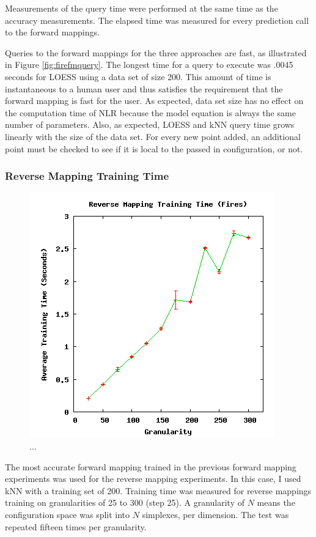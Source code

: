 Measurements of the query time were performed at the same time as the accuracy measurements.
The elapsed time was measured for every prediction call to the forward mappings.

Queries to the forward mappings for the three approaches are fast, as illustrated in Figure \ref{fig:firefmquery}.
The longest time for a query to execute was .0045 seconds for LOESS using a data set of size 200.
This amount of time is instantaneous to a human user and thus satisfies the requirement that the forward mapping is fast for the user.
As expected, data set size has no effect on the computation time of NLR because the model equation is always the same number of parameters.
Also, as expected, LOESS and kNN query time grows linearly with the size of the data set.
For every new point added, an additional point must be checked to see if it is local to the passed in configuration, or not.


\subsubsection{Reverse Mapping Training Time}

\begin{figure}[ht]
\centering
\includegraphics[scale=.5]{images/results_fires/rmtraining.png}
\caption{...}
\label{fig:rmtraining}
\end{figure}

The most accurate forward mapping trained in the previous forward mapping experiments was used for the reverse mapping experiments.
In this case, I used kNN with a training set of 200.
Training time was measured for reverse mappings training on granularities of 25 to 300 (step 25).
A granularity of $N$ means the configuration space was split into $N$ simplexes, per dimension.
The test was repeated fifteen times per granularity.

